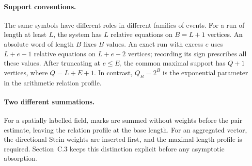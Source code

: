 \paragraph{Support conventions.}
The same symbols have different roles in different families of events.
For a run of length at least $L$, the system has $L$ relative equations
on $B=L+1$ vertices. An absolute word of length $B$ fixes $B$ values.
An exact run with excess $e$ uses $L+e+1$ relative equations on
$L+e+2$ vertices; recording its sign prescribes all these values.
After truncating at $e\le E$, the common maximal support has $Q+1$
vertices, where $Q=L+E+1$. In contrast, $Q_B=2^B$ is the exponential
parameter in the arithmetic relation profile.

\paragraph{Two different summations.}
For a spatially labelled field, marks are summed without weights before
the pair estimate, leaving the relation profile at the base length.
For an aggregated vector, the directional Stein weights are inserted
first, and the maximal-length profile is required. Section~C.3 keeps
this distinction explicit before any asymptotic absorption.
